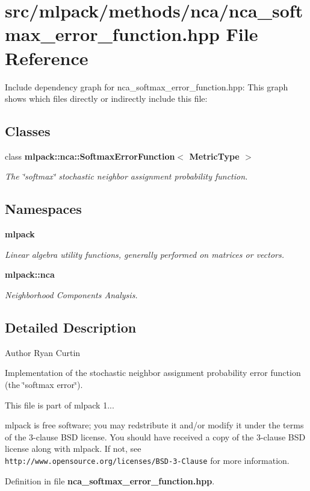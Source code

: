 \section{src/mlpack/methods/nca/nca\-\_\-softmax\-\_\-error\-\_\-function.hpp File Reference}
\label{nca__softmax__error__function_8hpp}
Include dependency graph for nca\-\_\-softmax\-\_\-error\-\_\-function.\-hpp\-:
This graph shows which files directly or indirectly include this file\-:
\subsection*{Classes}
\begin{DoxyCompactItemize}
\item 
class {\bf mlpack\-::nca\-::\-Softmax\-Error\-Function$<$ Metric\-Type $>$}
\begin{DoxyCompactList}\small\item\em The \char`\"{}softmax\char`\"{} stochastic neighbor assignment probability function. \end{DoxyCompactList}\end{DoxyCompactItemize}
\subsection*{Namespaces}
\begin{DoxyCompactItemize}
\item 
{\bf mlpack}
\begin{DoxyCompactList}\small\item\em Linear algebra utility functions, generally performed on matrices or vectors. \end{DoxyCompactList}\item 
{\bf mlpack\-::nca}
\begin{DoxyCompactList}\small\item\em Neighborhood Components Analysis. \end{DoxyCompactList}\end{DoxyCompactItemize}


\subsection{Detailed Description}
\begin{DoxyAuthor}{Author}
Ryan Curtin
\end{DoxyAuthor}
Implementation of the stochastic neighbor assignment probability error function (the \char`\"{}softmax error\char`\"{}).

This file is part of mlpack 1...

mlpack is free software; you may redstribute it and/or modify it under the terms of the 3-\/clause B\-S\-D license. You should have received a copy of the 3-\/clause B\-S\-D license along with mlpack. If not, see {\tt http\-://www.\-opensource.\-org/licenses/\-B\-S\-D-\/3-\/\-Clause} for more information. 

Definition in file {\bf nca\-\_\-softmax\-\_\-error\-\_\-function.\-hpp}.

